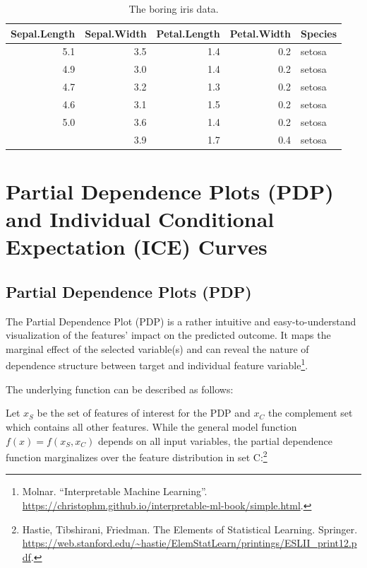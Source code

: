 \documentclass[]{krantz}
\begin{document}
\begin{table}[t]

\caption{\label{tab:iris}The boring iris data.}
\centering
\begin{tabular}{rrrrl}
\toprule
Sepal.Length & Sepal.Width & Petal.Length & Petal.Width & Species\\
\midrule
5.1 & 3.5 & 1.4 & 0.2 & setosa\\
4.9 & 3.0 & 1.4 & 0.2 & setosa\\
4.7 & 3.2 & 1.3 & 0.2 & setosa\\
4.6 & 3.1 & 1.5 & 0.2 & setosa\\
5.0 & 3.6 & 1.4 & 0.2 & setosa\\
\addlinespace
5.4 & 3.9 & 1.7 & 0.4 & setosa\\
\bottomrule
\end{tabular}
\end{table}

\chapter{Partial Dependence Plots (PDP) and Individual Conditional
Expectation (ICE)
Curves}\label{partial-dependence-plots-pdp-and-individual-conditional-expectation-ice-curves}

\section{Partial Dependence Plots
(PDP)}\label{partial-dependence-plots-pdp}

The Partial Dependence Plot (PDP) is a rather intuitive and
easy-to-understand visualization of the features' impact on the
predicted outcome. It maps the marginal effect of the selected
variable(s) and can reveal the nature of dependence structure between
target and individual feature variable\footnote{Molnar. ``Interpretable
  Machine Learning''.
  \url{https://christophm.github.io/interpretable-ml-book/simple.html}.}.

The underlying function can be described as follows:

Let \(x_S\) be the set of features of interest for the PDP and \(x_C\)
the complement set which contains all other features. While the general
model function \(f(x) = f(x_S, x_C)\) depends on all input variables,
the partial dependence function marginalizes over the feature
distribution in set C:\footnote{Hastie, Tibshirani, Friedman. The
  Elements of Statistical Learning. Springer.
  \url{https://web.stanford.edu/~hastie/ElemStatLearn/printings/ESLII_print12.pdf}.}
\end{document}
